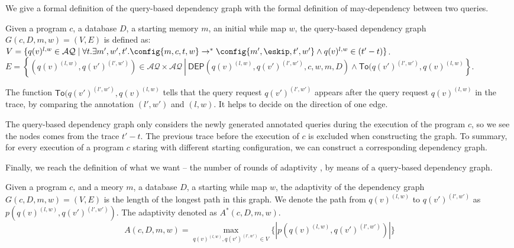 We give a formal definition of the query-based dependency graph with the formal definition of may-dependency between two queries.  
\begin{defn}
Given a program $c$, a database $D$, a starting memory $m$, an initial while map $w$, the query-based dependency graph $G(c,D,m,w) = (V, E)$ is defined as: \\
$V =\{q(v)^{l,w} \in \mathcal{AQ} \mid \forall t. \exists m',  w', t'.  \config{m ,c, t, w}  \to^{*}  \config{m' , \eskip, t', w' }  \land q(v)^{l,w} \in {(t'-t)}  \}$.
\\
$E = \left\{(q(v)^{(l,w)},q(v')^{(l',w')}) \in \mathcal{AQ} \times \mathcal{AQ} 
~ \left \vert ~ \mathsf{DEP}(q(v)^{(l,w)},q(v')^{(l',w')}, c,w,m,D)
\land \mathsf{To}(q(v')^{(l',w')}, q(v)^{(l,w)} \right.\right\}$.
\end{defn}
%
The function $\mathsf{To}(q(v')^{(l',w')}, q(v)^{(l,w)}$ tells that the query request $q(v')^{(l',w')}$ appears after the query request $q(v)^{(l,w)}$ in the trace, by comparing the annotation $(l',w')$ and $(l,w)$. It helps to decide on the direction of one edge.

The query-based dependency graph only considers the newly generated annotated queries during the execution of the program $c$, so we see the nodes comes from the trace $t'-t$. The previous trace before the execution of $c$ is excluded when constructing the graph. To summary, for every execution of a program $c$ staring with different starting configuration, we can construct a corresponding dependency graph. 

Finally, we reach the definition of what we want -- the number of rounds of adaptivity , by means of a query-based dependency graph. 

\begin{defn}[Adaptivity]
Given a program $c$, and a meory $m$, a database $D$, a starting while map $w$, the adaptivity of the dependency graph $G(c, D,m,w) = (V, E)$ is the length of the longest path in this graph. We denote the path from $q(v)^{(l,w)}$ to $q(v')^{(l',w')}$ as $p(q(v)^{(l,w)}, q(v')^{(l',w')} )$. The adaptivity denoted as $A^{*}(c, D, m, w)$.
%
$$A(c, D, m, w) = \max\limits_{q(v)^{(l,w)},q(v')^{(l',w')} \in V }\{ |p(q(v)^{(l,w)}, q(v')^{(l',w')} )| \}$$
\end{defn}



